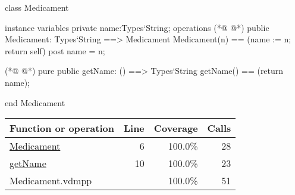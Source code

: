 \begin{vdmpp}[breaklines=true]
class Medicament

instance variables
  private name:Types`String;
operations
(*@
\label{Medicament:6}
@*)
 public Medicament: Types`String ==> Medicament
  Medicament(n) == (name := n; return self)
 post name = n;
 
(*@
\label{getName:10}
@*)
 pure public getName: () ==> Types`String
  getName() == (return name);

end Medicament
\end{vdmpp}
\bigskip
\begin{longtable}{|l|r|r|r|}
\hline
Function or operation & Line & Coverage & Calls \\
\hline
\hline
\hyperref[Medicament:6]{Medicament} & 6&100.0\% & 28 \\
\hline
\hyperref[getName:10]{getName} & 10&100.0\% & 23 \\
\hline
\hline
Medicament.vdmpp & & 100.0\% & 51 \\
\hline
\end{longtable}

